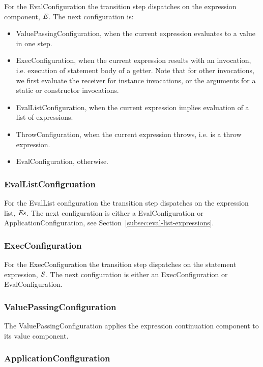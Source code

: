 \documentclass{article}
\begin{document}
For the EvalConfiguration the transition step dispatches on the expression component, $\mathit{E}$. The next configuration is:
\begin{itemize}
\item ValuePassingConfiguration, when the current expression evaluates to a value in one step.
\item ExecConfiguration, when the current expression results with an invocation, i.e. execution of statement body of a getter. Note that for other invocations, we first evaluate the receiver for instance invocations, or the arguments for a static or constructor invocations.
\item EvalListConfiguration, when the current expression implies evaluation of a list of expressions.
\item ThrowConfiguration, when the current expression throws, i.e. is a throw expression.
\item EvalConfiguration, otherwise.
\end{itemize}

\subsubsection{EvalListConfigruation}
\label{subsubsec:evallistconfig}

For the EvalList configuration the transition step dispatches on the expression list, $\mathit{E}\mathit{s}$. The next configuration is either a EvalConfiguration or ApplicationConfiguration, see Section~\ref{subsec:eval-list-expressions}.

\subsubsection{ExecConfiguration}
\label{subsubsec:execconfig}

For the ExecConfiguration the transition step dispatches on the statement expression, $\mathit{S}$. The next configuration is either an ExecConfiguration or EvalConfiguration.

\subsubsection{ValuePassingConfiguration}
\label{suubsubsec:valuepassingconfig}

The ValuePassingConfiguration applies the expression continuation component to its value component.

\subsubsection{ApplicationConfiguration}
\label{subsubsec:applicationconfig}
\end{document}
